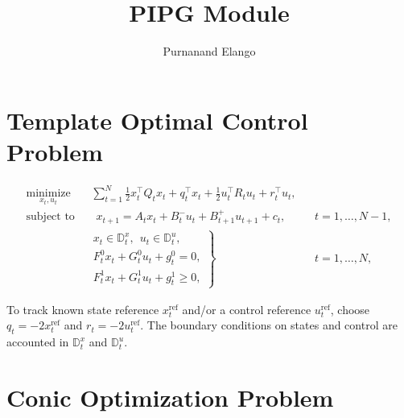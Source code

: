 \documentclass[letterpaper,11pt]{article}
\title{PIPG Module}
\author{Purnanand Elango}
\begin{document}
\maketitle 

\section{Template Optimal Control Problem}


\begin{align*}
    \underset{x_t,u_t}{\operatorname{minimize}}~~~&~\sum_{t=1}^N\frac{1}{2}x_t^\top Q_t x_t +q_t^\top x_t + \frac{1}{2}u_t^\top R_t u_t + r_t^\top u_t,\\
    \operatorname{subject~to}~~&~~~x_{t+1} = A_t x_t + B_t^{-}u_t + B_{t+1}^+u_{t+1} + c_t, & & t = 1,\ldots,N-1,\\
        & \left. \begin{array}{l} 
        x_t\in\mathbb{D}^x_t,~~u_t \in \mathbb{D}^u_t,\\[0.1cm]
        F^0_t x_t + G^0_t u_t + g^0_t = 0, \\[0.1cm]
        F^1_t x_t + G^1_t u_t + g^1_t \ge 0, \end{array} \right\} & & t = 1,\ldots, N,  
\end{align*}

To track known state reference $x_t^{\text{ref}}$ and/or a control reference $u^{\text{ref}}_t$, choose $q_t = -2x_t^{\text{ref}}$ and $r_t = -2u^{\text{ref}}_t$. The boundary conditions on states and control are accounted in $\mathbb{D}^x_t$ and $\mathbb{D}^u_t$.

\section{Conic Optimization Problem}
\end{document}
